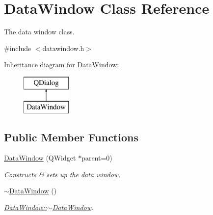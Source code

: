 \hypertarget{class_data_window}{}\section{Data\+Window Class Reference}
\label{class_data_window}


The data window class.  




{\ttfamily \#include $<$datawindow.\+h$>$}

Inheritance diagram for Data\+Window\+:\begin{figure}[H]
\begin{center}
\leavevmode
\includegraphics[height=2.000000cm]{class_data_window}
\end{center}
\end{figure}
\subsection*{Public Member Functions}
\begin{DoxyCompactItemize}
\item 
\hyperlink{class_data_window_aa4f27d2945b5cf6dd26e8b73bbc8aaa0}{Data\+Window} (Q\+Widget $\ast$parent=0)
\begin{DoxyCompactList}\small\item\em Constructs \& sets up the data window. \end{DoxyCompactList}\item 
\hyperlink{class_data_window_a6e72c3705abc085d3d84cb182493cd6a}{$\sim$\+Data\+Window} ()
\begin{DoxyCompactList}\small\item\em \hyperlink{class_data_window_a6e72c3705abc085d3d84cb182493cd6a}{Data\+Window\+::$\sim$\+Data\+Window}. \end{DoxyCompactList}\end{DoxyCompactItemize}
